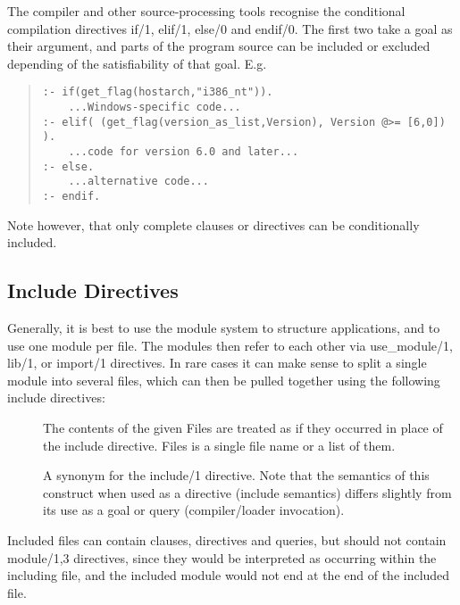 The compiler and other source-processing tools recognise the conditional
compilation directives if/1, elif/1, else/0 and endif/0. The first two
take a goal as their argument, and parts of the program source can be
included or excluded depending of the satisfiability of that goal. E.g.
\begin{quote}\begin{verbatim}
:- if(get_flag(hostarch,"i386_nt")).
    ...Windows-specific code...
:- elif( (get_flag(version_as_list,Version), Version @>= [6,0]) ).
    ...code for version 6.0 and later...
:- else.
    ...alternative code...
:- endif.
\end{verbatim}
\end{quote}
Note however, that only complete clauses or directives can be
conditionally included.


\subsection{Include Directives}
\label{secinclude}

Generally, it is best to use the module system to structure {\eclipse}
applications, and to use one module per file.  The modules then refer
to each other via use_module/1, lib/1, or import/1 directives.
In rare cases it can make sense to split a single module into several
files, which can then be pulled together using the following include
directives:
\begin{description}
\item[]
The contents of the given Files are treated as if they occurred in place of
the include directive.  Files is a single file name or a list of them.

\item[]
A synonym for the include/1 directive.  Note that the semantics of this
construct when used as a directive (include semantics) differs slightly
from its use as a goal or query (compiler/loader invocation).
\end{description}
Included files can contain clauses, directives and queries, but should
not contain module/1,3 directives, since they would be interpreted as
occurring within the including file, and the included module would
not end at the end of the included file.


